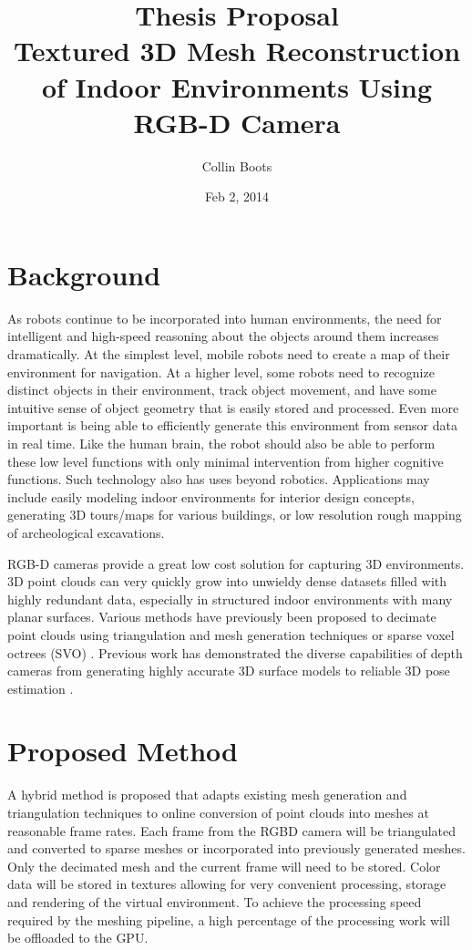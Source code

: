 \documentclass[english]{article}
\title{Thesis Proposal \\Textured 3D Mesh Reconstruction of Indoor Environments Using RGB-D Camera}
\author{Collin Boots}
\date{Feb 2, 2014}
\begin{document}
\maketitle
\section{Background}
As robots continue to be incorporated into human environments, the need for intelligent and high-speed reasoning about the objects around them increases dramatically. At the simplest level, mobile robots need to create a map of their environment for navigation. At a higher level, some robots need to recognize distinct objects in their environment, track object movement, and have some intuitive sense of object geometry that is easily stored and processed. Even more important is being able to efficiently generate this environment from sensor data in real time. Like the human brain, the robot should also be able to perform these low level functions with only minimal intervention from higher cognitive functions. Such technology also has uses beyond robotics. Applications may include easily modeling indoor environments for interior design concepts, generating 3D tours/maps for various buildings, or low resolution rough mapping of archeological excavations. 

RGB-D cameras provide a great low cost solution for capturing 3D environments. 3D point clouds can very quickly grow into unwieldy dense datasets filled with highly redundant data, especially in structured indoor environments with many planar surfaces. Various methods have previously been proposed to decimate point clouds using triangulation and mesh generation techniques or sparse voxel octrees (SVO)\cite{KinectFusion,fastvoxelmaps,quadrocopterslam,octomap} . Previous work has demonstrated the diverse capabilities of depth cameras from generating highly accurate 3D surface models to reliable 3D pose estimation \cite{Endres,KinectFusion,Taguchi}.

\section{Proposed Method}
A hybrid method is proposed that adapts existing mesh generation and triangulation techniques to online conversion of point clouds into meshes at reasonable frame rates. Each frame from the RGBD camera will be triangulated and converted to sparse meshes or incorporated into previously generated meshes. Only the decimated mesh and the current frame will need to be stored. Color data will be stored in textures allowing for very convenient processing, storage and rendering of the virtual environment. To achieve the processing speed required by the meshing pipeline, a high percentage of the processing work will be offloaded to the GPU.
\end{document}
